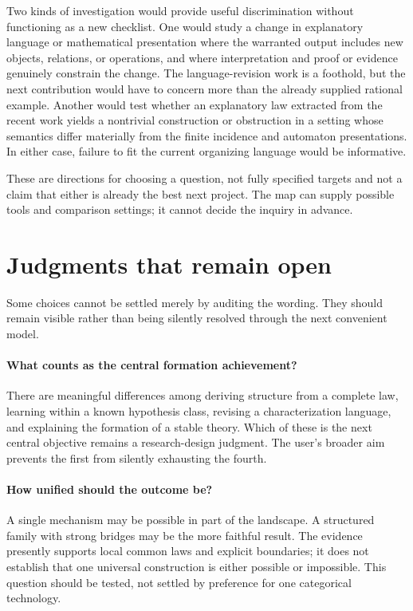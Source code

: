 \documentclass[11pt]{article}
\begin{document}
Two kinds of investigation would provide useful discrimination without functioning as a new checklist. One would study a change in explanatory language or mathematical presentation where the warranted output includes new objects, relations, or operations, and where interpretation and proof or evidence genuinely constrain the change. The language-revision work is a foothold, but the next contribution would have to concern more than the already supplied rational example. Another would test whether an explanatory law extracted from the recent work yields a nontrivial construction or obstruction in a setting whose semantics differ materially from the finite incidence and automaton presentations. In either case, failure to fit the current organizing language would be informative.

These are directions for choosing a question, not fully specified targets and not a claim that either is already the best next project. The map can supply possible tools and comparison settings; it cannot decide the inquiry in advance.

\section{Judgments that remain open}
\label{sec:open}

Some choices cannot be settled merely by auditing the wording. They should remain visible rather than being silently resolved through the next convenient model.

\paragraph{What counts as the central formation achievement?}
There are meaningful differences among deriving structure from a complete law, learning within a known hypothesis class, revising a characterization language, and explaining the formation of a stable theory. Which of these is the next central objective remains a research-design judgment. The user's broader aim prevents the first from silently exhausting the fourth.

\paragraph{How unified should the outcome be?}
A single mechanism may be possible in part of the landscape. A structured family with strong bridges may be the more faithful result. The evidence presently supports local common laws and explicit boundaries; it does not establish that one universal construction is either possible or impossible. This question should be tested, not settled by preference for one categorical technology.
\end{document}
